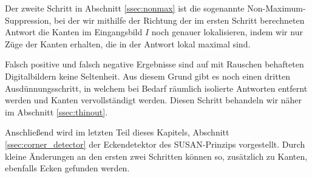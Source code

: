 \documentclass[a4paper, 11pt]{report}
\theoremstyle{definition}
\begin{document}
		Der zweite Schritt in Abschnitt \ref{ssec:nonmax} ist die sogenannte Non-Maximum-Suppression, bei der wir mithilfe der Richtung der im ersten Schritt berechneten Antwort die Kanten im Eingangsbild $I$ noch genauer lokalisieren, indem wir nur Züge der Kanten erhalten, die in der Antwort lokal maximal sind.

		Falsch positive und falsch negative Ergebnisse sind auf mit Rauschen behafteten Digitalbildern keine Seltenheit. Aus diesem Grund gibt es noch einen dritten Ausdünnungsschritt, in welchem bei Bedarf räumlich isolierte Antworten entfernt werden und Kanten vervollständigt werden. Diesen Schritt behandeln wir näher im Abschnitt \ref{ssec:thinout}.

		Anschließend wird im letzten Teil dieses Kapitels, Abschnitt \ref{ssec:corner_detector} der Eckendetektor des SUSAN-Prinzips vorgestellt. Durch kleine Änderungen an den ersten zwei Schritten können so, zusätzlich zu Kanten, ebenfalls Ecken gefunden werden.
\end{document}
